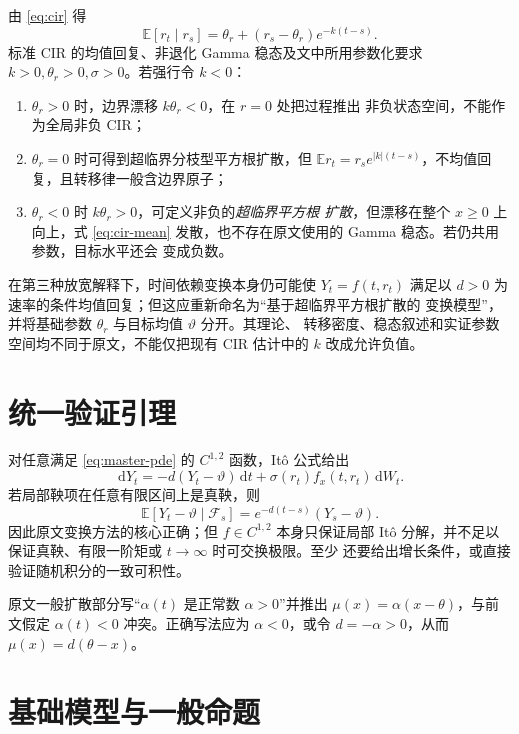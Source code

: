\documentclass[UTF8,11pt]{ctexart}
\newcommand{\dd}{\,\mathrm d}
\newcommand{\E}{\mathbb E}
\begin{document}
由 \eqref{eq:cir} 得
\begin{equation}
 \E[r_t\mid r_s]
 =\theta_r+(r_s-\theta_r)e^{-k(t-s)}.
 \label{eq:cir-mean}
\end{equation}
标准 CIR 的均值回复、非退化 Gamma 稳态及文中所用参数化要求
$k>0,\theta_r>0,\sigma>0$。若强行令 $k<0$：
\begin{enumerate}
 \item $\theta_r>0$ 时，边界漂移 $k\theta_r<0$，在 $r=0$ 处把过程推出
       非负状态空间，不能作为全局非负 CIR；
 \item $\theta_r=0$ 时可得到超临界分枝型平方根扩散，但
       $\E r_t=r_s e^{|k|(t-s)}$，不均值回复，且转移律一般含边界原子；
 \item $\theta_r<0$ 时 $k\theta_r>0$，可定义非负的\emph{超临界平方根
       扩散}，但漂移在整个 $x\geq0$ 上向上，式 \eqref{eq:cir-mean}
       发散，也不存在原文使用的 Gamma 稳态。若仍共用参数，目标水平还会
       变成负数。
\end{enumerate}
在第三种放宽解释下，时间依赖变换本身仍可能使 $Y_t=f(t,r_t)$ 满足以
$d>0$ 为速率的条件均值回复；但这应重新命名为“基于超临界平方根扩散的
变换模型”，并将基础参数 $\theta_r$ 与目标均值 $\vartheta$ 分开。其理论、
转移密度、稳态叙述和实证参数空间均不同于原文，不能仅把现有 CIR 估计中的
$k$ 改成允许负值。

\section{统一验证引理}

对任意满足 \eqref{eq:master-pde} 的 $C^{1,2}$ 函数，It\^o 公式给出
\begin{equation}
 \dd Y_t=-d(Y_t-\vartheta)\dd t+
 \sigma(r_t)f_x(t,r_t)\dd W_t.
 \label{eq:transformed-sde}
\end{equation}
若局部鞅项在任意有限区间上是真鞅，则
\begin{equation}
 \E[Y_t-\vartheta\mid\mathcal F_s]
 =e^{-d(t-s)}(Y_s-\vartheta).
 \label{eq:conditional-mr}
\end{equation}
因此原文变换方法的核心正确；但 $f\in C^{1,2}$ 本身只保证局部 It\^o
分解，并不足以保证真鞅、有限一阶矩或 $t\to\infty$ 时可交换极限。至少
还要给出增长条件，或直接验证随机积分的一致可积性。

原文一般扩散部分写“$\alpha(t)$ 是正常数 $\alpha>0$”并推出
$\mu(x)=\alpha(x-\theta)$，与前文假定 $\alpha(t)<0$ 冲突。正确写法应为
$\alpha<0$，或令 $d=-\alpha>0$，从而 $\mu(x)=d(\theta-x)$。

\section{基础模型与一般命题}
\end{document}
